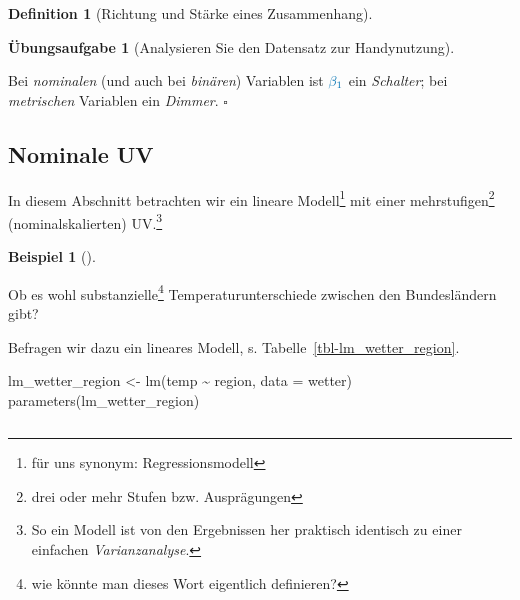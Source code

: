 \documentclass[
  a4paper,
  DIV=11]{scrreprt}
\newenvironment{Shaded}{\begin{snugshade}}{\end{snugshade}}
\newcommand{\AttributeTok}[1]{\textcolor[rgb]{0.40,0.45,0.13}{#1}}
\newcommand{\FunctionTok}[1]{\textcolor[rgb]{0.28,0.35,0.67}{#1}}
\newcommand{\NormalTok}[1]{\textcolor[rgb]{0.00,0.23,0.31}{#1}}
\newcommand{\OtherTok}[1]{\textcolor[rgb]{0.00,0.23,0.31}{#1}}
\newcommand{\SpecialCharTok}[1]{\textcolor[rgb]{0.37,0.37,0.37}{#1}}
\theoremstyle{definition}
\newtheorem{exercise}{Übungsaufgabe}[chapter]
\theoremstyle{definition}
\newtheorem{example}{Beispiel}[chapter]
\theoremstyle{definition}
\newtheorem{definition}{Definition}[chapter]
\theoremstyle{remark}
\begin{document}
\begin{definition}[Richtung und Stärke eines
Zusammenhang]
\begin{exercise}[Analysieren Sie den Datensatz zur
Handynutzung]
\begin{tcolorbox}
Bei \emph{nominalen} (und auch bei \emph{binären}) Variablen ist
\(\color{beta1col}{\beta_1}\) ein \emph{Schalter}; bei \emph{metrischen}
Variablen ein \emph{Dimmer}.\footnotemark{} \(\square\)

\end{tcolorbox}


\subsection{Nominale UV}\label{nominale-uv}

In diesem Abschnitt betrachten wir ein lineare Modell\footnote{für uns
  synonym: Regressionsmodell} mit einer mehrstufigen\footnote{drei oder
  mehr Stufen bzw. Ausprägungen} (nominalskalierten) UV.\footnote{So ein
  Modell ist von den Ergebnissen her praktisch identisch zu einer
  einfachen \emph{Varianzanalyse}.}

\begin{example}[]\protect\hypertarget{exm-wetter2}{}\label{exm-wetter2}

Ob es wohl substanzielle\footnote{wie könnte man dieses Wort eigentlich
  definieren?} Temperaturunterschiede zwischen den Bundesländern gibt?

\end{example}

Befragen wir dazu ein lineares Modell, s.
Tabelle~\ref{tbl-lm_wetter_region}.

\begin{Shaded}
\begin{Highlighting}[]
\NormalTok{lm\_wetter\_region }\OtherTok{\textless{}{-}} \FunctionTok{lm}\NormalTok{(temp }\SpecialCharTok{\textasciitilde{}}\NormalTok{ region, }\AttributeTok{data =}\NormalTok{ wetter)}
\FunctionTok{parameters}\NormalTok{(lm\_wetter\_region)}
\end{Highlighting}
\end{Shaded}

\begin{longtable}[]{@{}
  >{\raggedright\arraybackslash}p{}
  >{\centering\arraybackslash}p{}
  >{\centering\arraybackslash}p{}
  >{\centering\arraybackslash}p{}
  >{\centering\arraybackslash}p{}
  >{\centering\arraybackslash}p{}@{}}


\end{longtable}
\end{exercise}
\end{definition}
\end{document}
